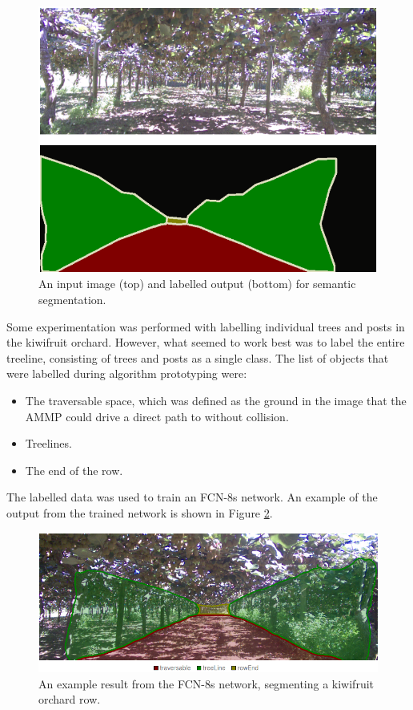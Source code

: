 \documentclass[preprint,authoryear,12pt]{elsarticle}
\begin{document}
    \begin{figure}[htb]
        \centering
        \includegraphics[width=\linewidth]{imgs/photos/segImgLabelPair.png}
        \caption{
            An input image (top) and labelled output (bottom) for semantic segmentation.
        }
        \label{fig:segImgLabelPair}
    \end{figure}

    Some experimentation was performed with labelling individual trees and posts in the kiwifruit orchard. However, what seemed to work best was to label the entire treeline, consisting of trees and posts as a single class. The list of objects that were labelled during algorithm prototyping were:
    \begin{itemize}
    \item The traversable space, which was defined as the ground in the image that the AMMP could drive a direct path to without collision.
    \item Treelines.
    \item The end of the row.
    \end{itemize}

    The labelled data was used to train an FCN-8s network. An example of the output from the trained network is shown in Figure \ref{fig:semSegRowResults}.

    \begin{figure}[htb]
        \centering
        \includegraphics[width=\linewidth]{imgs/photos/semSegRowResults.png}
        \caption{
            An example result from the FCN-8s network, segmenting a kiwifruit orchard row.
        }
        \label{fig:semSegRowResults}
    \end{figure}
\end{document}
